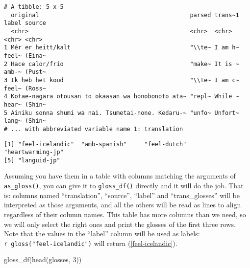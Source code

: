 \documentclass[
  letterpaper,
  DIV=11,
  numbers=noendperiod]{scrartcl}
\newenvironment{Shaded}{\begin{snugshade}}{\end{snugshade}}
\newcommand{\DecValTok}[1]{\textcolor[rgb]{0.68,0.00,0.00}{#1}}
\newcommand{\FunctionTok}[1]{\textcolor[rgb]{0.28,0.35,0.67}{#1}}
\newcommand{\NormalTok}[1]{\textcolor[rgb]{0.00,0.23,0.31}{#1}}
\newcommand{\SpecialCharTok}[1]{\textcolor[rgb]{0.37,0.37,0.37}{#1}}
\begin{document}
\begin{verbatim}
# A tibble: 5 x 5
  original                                           parsed trans~1 label source
  <chr>                                              <chr>  <chr>   <chr> <chr> 
1 Mér er heitt/kalt                                  "\\te~ I am h~ feel~ (Eina~
2 Hace calor/frío                                    "make~ It is ~ amb-~ (Pust~
3 Ik heb het koud                                    "\\te~ I am c~ feel~ (Ross~
4 Kotae-nagara otousan to okaasan wa honobonoto ata~ "repl~ While ~ hear~ (Shin~
5 Ainiku sonna shumi wa nai. Tsumetai-none. Kedaru-~ "unfo~ Unfort~ lang~ (Shin~
# ... with abbreviated variable name 1: translation
\end{verbatim}

\begin{Shaded}
\end{Shaded}

\begin{verbatim}
[1] "feel-icelandic"  "amb-spanish"     "feel-dutch"      "heartwarming-jp"
[5] "languid-jp"     
\end{verbatim}

Assuming you have them in a table with columns matching the arguments of
\texttt{as\_gloss()}, you can give it to \texttt{gloss\_df()} directly
and it will do the job. That is: columns named ``translation'',
``source'', ``label'' and ``trans\_glosses'' will be interpreted as
those arguments, and all the others will be read as lines to align
regardless of their column names. This table has more columns than we
need, so we will only select the right ones and print the glosses of the
first three rows. Note that the values in the ``label'' column will be
used as labels:
\texttt{\textasciigrave{}r\ gloss("feel-icelandic")\textasciigrave{}}
will return (\ref{feel-icelandic}).

\begin{Shaded}
\begin{Highlighting}[]
\FunctionTok{gloss\_df}\NormalTok{(}\FunctionTok{head}\NormalTok{(glosses, }\DecValTok{3}\NormalTok{))}
\end{Highlighting}
\end{Shaded}

\end{document}
